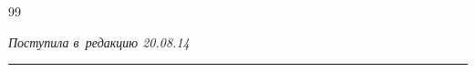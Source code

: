 {{\begin{thebibliography}{99}





































\end{thebibliography}


} }








\vspace*{-5pt}





\hfill{\small\textit{Поступила в~редакцию 20.08.14}}





\vspace*{7pt}





\hrule





